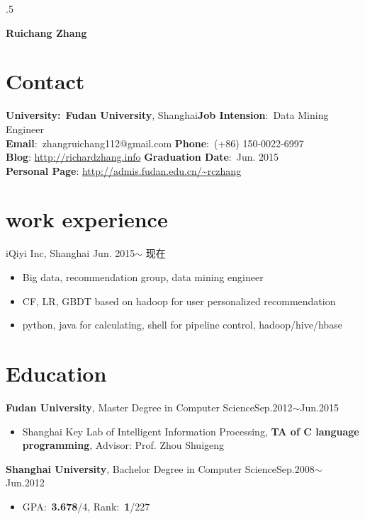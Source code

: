 \documentclass[margin]{res}
\begin{document}
 \moveleft.5\hoffset\centerline{\large\bf Ruichang Zhang}
 
\begin{resume}
\setlength{\parskip}{0.1em}
\section{Contact}
\textbf{University:}~{\bf Fudan University}, Shanghai\hfill \textbf{Job Intension}:~Data Mining Engineer\\
\textbf{Email}:~zhangruichang112@gmail.com \hfill  \textbf{Phone}:~(+86) 150-0022-6997\\
\textbf{Blog}: \url{http://richardzhang.info} \hfill \textbf{Graduation Date}:~Jun. 2015\\
\textbf{Personal Page}: \url{http://admis.fudan.edu.cn/~rczhang}

\section{work experience}
iQiyi Inc, Shanghai \hfill  Jun. 2015$\sim$ 现在
\begin{itemize} \itemsep -1pt %
\item Big data, recommendation group, data mining engineer
\item CF, LR, GBDT based on hadoop for user personalized recommendation
\item python, java for calculating, shell for pipeline control, hadoop/hive/hbase
\end{itemize}

\section{Education}
 {\bf Fudan University}, Master Degree in Computer Science\hfill Sep.2012$\sim$Jun.2015
 \begin{itemize} \itemsep -1pt  %
 \item Shanghai Key Lab of Intelligent Information Processing, \textbf{TA of C language programming}, Advisor: Prof. Zhou Shuigeng
 \end{itemize}
 {\bf Shanghai University}, Bachelor Degree in Computer Science\hfill Sep.2008$\sim$ Jun.2012
\begin{itemize} \itemsep -1pt %
\item GPA:~\textbf{3.678}/4, Rank:~\textbf{1}/227
\end{itemize}


\end{resume}
\end{document}
